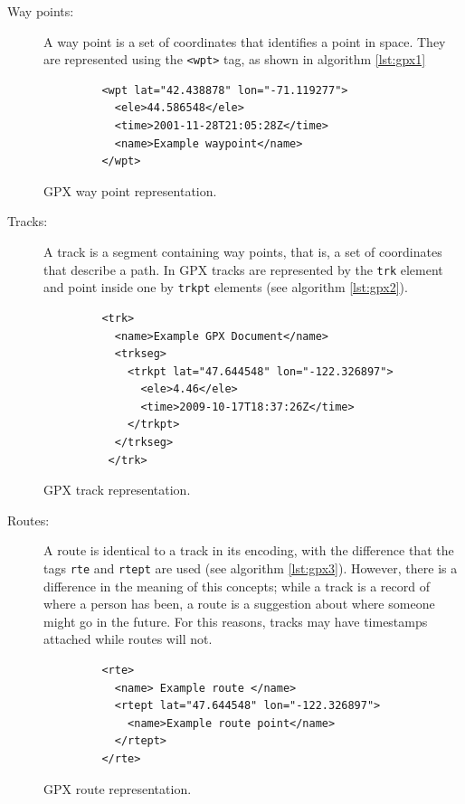 \begin{description}
\item[Way points:] A way point is a set of coordinates that identifies a point in space. They are represented using the \texttt{<wpt>} tag, as shown in algorithm \ref{lst:gpx1}

\begin{listing}\centering
  \begin{minipage}{.5\textwidth}
    \begin{verbatim}
	     <wpt lat="42.438878" lon="-71.119277">
	       <ele>44.586548</ele>
	       <time>2001-11-28T21:05:28Z</time>
	       <name>Example waypoint</name>
	     </wpt>
    \end{verbatim}
  \end{minipage}
  \caption{GPX way point representation.}\label{lst:gpx1}
\end{listing}


\item[Tracks:] A track is a segment containing way points, that is, a set of coordinates that describe a path. In GPX tracks are represented by the \texttt{trk} element and point inside one by \texttt{trkpt} elements (see algorithm \ref{lst:gpx2}).

\begin{listing}\centering
  \begin{minipage}{.5\textwidth}
    \begin{verbatim}
	     <trk>
	       <name>Example GPX Document</name>
	       <trkseg>
	         <trkpt lat="47.644548" lon="-122.326897">
	           <ele>4.46</ele>
	           <time>2009-10-17T18:37:26Z</time>
	         </trkpt>
	       </trkseg>
	      </trk>
    \end{verbatim}
  \end{minipage}
  \caption{GPX track representation.}\label{lst:gpx2}
\end{listing}

\item[Routes:] A route is identical to a track in its encoding, with the difference that the tags \texttt{rte} and \texttt{rtept} are used (see algorithm \ref{lst:gpx3}). However, there is a difference in the meaning of this concepts; while a track is a record of where a person has been, a route is a suggestion about where someone might go in the future. For this reasons, tracks may have timestamps attached while routes will not.

\begin{listing}\centering
  \begin{minipage}{.5\textwidth}
    \begin{verbatim}
	     <rte>
	       <name> Example route </name>
	       <rtept lat="47.644548" lon="-122.326897">
	         <name>Example route point</name>
	       </rtept>
	     </rte>
    \end{verbatim}
  \end{minipage}
  \caption{GPX route representation.}\label{lst:gpx3}
\end{listing}

\end{description}

